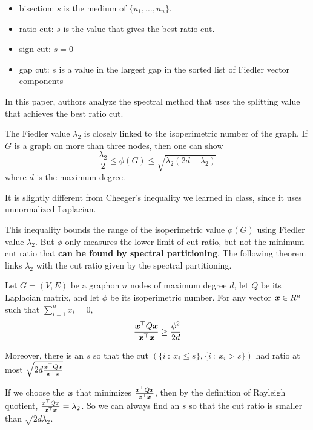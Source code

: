\documentclass[11pt]{article}
\begin{document}
\begin{itemize}
\item bisection: $s$ is the medium of $\{u_1,\dots, u_n\}$.
\item ratio cut: $s$ is the value that gives the best ratio cut.
\item sign cut: $s=0$
\item gap cut: $s$ is a value in the largest gap in the sorted list of Fiedler vector components
\end{itemize}

In this paper, authors analyze the spectral method that uses the splitting value that achieves the best ratio cut.

The Fiedler value $\lambda_2$ is closely linked to the isoperimetric number of the graph. If $G$ is a graph on more than three nodes, then one can show
$$
\frac{\lambda_2}{2} \leq \phi(G) \leq \sqrt{\lambda_2 (2d-\lambda_2)}
$$
where $d$ is the maximum degree.

\begin{remark}
It is slightly different from Cheeger's inequality we learned in class, since it uses unnormalized Laplacian.
\end{remark}

This inequality bounds the range of the isoperimetric value $\phi(G)$ using Fiedler value $\lambda_2$. But $\phi$ only measures the lower limit of cut ratio, but not the minimum cut ratio that \textbf{can be found by spectral partitioning}. The following theorem links $\lambda_2$ with the cut ratio given by the spectral partitioning.

\begin{theorem}\label{mihail}
Let $G=(V,E)$ be a graphon $n$ nodes of maximum degree $d$, let $Q$ be its Laplacian matrix, and let $\phi$ be its isoperimetric number. For any vector $\boldsymbol{\mathit{x}} \in R^n$ such that $\sum_{i=1}^n x_i = 0$,
$$
\frac{\boldsymbol{\mathit{x}}^\top Q \boldsymbol{\mathit{x}}}{\boldsymbol{\mathit{x}}^\top \boldsymbol{\mathit{x}}} \geq \frac{\phi^2}{2d}
$$

Moreover, there is an $s$ so that the cut $(\{i~:~x_i \leq s\}, \{i~:~x_i > s\})$ had ratio at most $\sqrt{2d\frac{\boldsymbol{\mathit{x}}^\top Q \boldsymbol{\mathit{x}}}{\boldsymbol{\mathit{x}}^\top\boldsymbol{\mathit{x}}}}$
\end{theorem}

If we choose the $\boldsymbol{\mathit{x}}$ that minimizes $\frac{\boldsymbol{\mathit{x}}^\top Q \boldsymbol{\mathit{x}}}{\boldsymbol{\mathit{x}}^\top\boldsymbol{\mathit{x}}}$, then by the definition of Rayleigh quotient, $\frac{\boldsymbol{\mathit{x}}^\top Q \boldsymbol{\mathit{x}}}{\boldsymbol{\mathit{x}}^\top\boldsymbol{\mathit{x}}} = \lambda_2$. So we can always find an $s$ so that the cut ratio is smaller than $\sqrt{2d\lambda_2}$.
\end{document}
